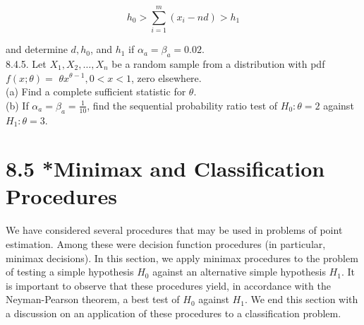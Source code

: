 $$
h_{0}>\sum_{i=1}^{m}\left(x_{i}-n d\right)>h_{1}
$$

and determine $d, h_{0}$, and $h_{1}$ if $\alpha_{a}=\beta_{a}=0.02$.\\
8.4.5. Let $X_{1}, X_{2}, \ldots, X_{n}$ be a random sample from a distribution with pdf $f(x ; \theta)=$ $\theta x^{\theta-1}, 0<x<1$, zero elsewhere.\\
(a) Find a complete sufficient statistic for $\theta$.\\
(b) If $\alpha_{a}=\beta_{a}=\frac{1}{10}$, find the sequential probability ratio test of $H_{0}: \theta=2$ against $H_{1}: \theta=3$.

\section*{8.5 *Minimax and Classification Procedures}
We have considered several procedures that may be used in problems of point estimation. Among these were decision function procedures (in particular, minimax decisions). In this section, we apply minimax procedures to the problem of testing a simple hypothesis $H_{0}$ against an alternative simple hypothesis $H_{1}$. It is important to observe that these procedures yield, in accordance with the Neyman-Pearson theorem, a best test of $H_{0}$ against $H_{1}$. We end this section with a discussion on an application of these procedures to a classification problem.

